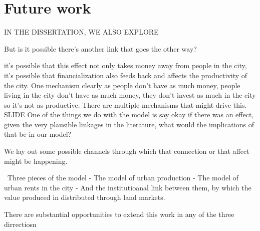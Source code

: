 \documentclass[]{article}
\begin{document}
\section{Future work}


IN THE DISSERTATION, WE ALSO EXPLORE

But is it possible there's another link that goes the other way?

it's  possible that this effect not only takes money away from people in the city, it's possible that financialization also feeds back and  affects the productivity of the city. One mechanism clearly as people don't have as much money, people living in the city don't have as much money, they don't invest as much in the city so it's not as productive. 
There are multiple mechanisms that might drive this. SLIDE
One of the things we do with the model is say okay if there was an effect, given the very plausible linkages in the literature, what would the implications of that be in our model?



We lay out some possible channels through which that connection or that affect might be happening.


\
Three pieces of the model 
- The model of urban production
- The model of urban rents in the city
- And the institutioanal link between them, by which the value produced in distributed through land markets.

There are substantial opportunities to extend this work in any of the three dirrectiosn
\end{document}
